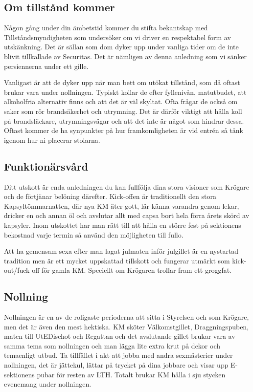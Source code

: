 \documentclass[10pt]{article}
\begin{document}
	\subsection{Om tillstånd kommer}
    Någon gång under din ämbetstid kommer du stifta bekantskap med Tillståndsmyndigheten som undersöker om vi driver en respektabel form av utskänkning. Det är sällan som dom dyker upp under vanliga tider om de inte blivit tillkallade av Securitas. Det är nämligen av denna anledning som vi sänker persiennerna under ett gille.

    Vanligast är att de dyker upp när man bett om utökat tillstånd, som då oftast brukar vara under nollningen. Typiskt kollar de efter fyllenivån, matutbudet, att alkoholfria alternativ finns och att det är väl skyltat. Ofta frågar de också om saker som rör brandsäkerhet och utrymning. Det är därför viktigt att hålla koll på brandsläckare, utrymningsvägar och att det inte är något som hindrar dessa. Oftast kommer de ha synpunkter på hur framkomligheten är vid entrén så tänk igenom hur ni placerar stolarna.

    \subsection{Funktionärsvård}
	Ditt utskott är enda anledningen du kan fullfölja dina stora visioner som Krögare och de förtjänar belöning därefter. Kick-offen är traditionellt den stora Kapsyltömmarnatten, där nya KM äter gott, lär känna varandra genom lekar, dricker en och annan öl och avslutar allt med capsa bort hela förra årets skörd av kapsyler. Inom utskottet har man rätt till att hålla en större fest på sektionens bekostnad varje termin så använd den möjligheten till fullo.

    Att ha gemensam sexa efter man lagat julmaten inför julgillet är en nystartad tradition men är ett mycket uppskattad tillskott och fungerar utmärkt som kick-out/fuck off för gamla KM. Speciellt om Krögaren trollar fram ett groggfat.


    \subsection{Nollning}
    Nollningen är en av de roligaste perioderna att sitta i Styrelsen och som Krögare, men det är även den mest hektiska. KM sköter Välkomstgillet, Draggningspuben, maten till UtEDischot och Regattan och det avslutande gillet brukar vara av samma tema som nollningen och man lägga lite extra krut på dekor och temaenligt utbud. Ta tillfället i akt att jobba med andra sexmästerier under nollningen, det är jättekul, lättar på trycket på dina jobbare och visar upp E-sektionens pubar för resten av LTH. Totalt brukar KM hålla i sju stycken evenemang under nollningen.
\end{document}
